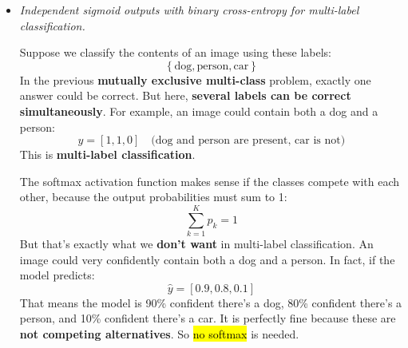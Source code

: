 \begin{itemize}
        In our example, if the correct class is \emph{dog}, then:
        \begin{equation*}
            \mathcal{L}_{\text{CCE}} = - \log(0.90) \approx 0.105
        \end{equation*}
        Which is a low loss, indicating a good prediction. If the correct class were \emph{cat}, then:
        \begin{equation*}
            \mathcal{L}_{\text{CCE}} = - \log(0.08) \approx 2.525
        \end{equation*}
        Which is a high loss, indicating a poor prediction. Therefore, ``\emph{Softmax output with categorical cross-entropy for mutually exclusive multi-class classification}'' is a  design choice.

    \item \emph{Independent sigmoid outputs with binary cross-entropy for multi-label classification.}

        Suppose we classify the contents of an image using these labels:
        \begin{equation*}
            \left\{\text{dog}, \text{person}, \text{car}\right\}
        \end{equation*}
        In the previous \textbf{mutually exclusive multi-class} problem, exactly one answer could be correct. But here, \textbf{several labels can be correct simultaneously}. For example, an image could contain both a dog and a person:
        \begin{equation*}
            y = \left[1, 1, 0\right] \quad \text{(dog and person are present, car is not)}
        \end{equation*}
        This is \textbf{multi-label classification}.

        The softmax activation function makes sense if the classes compete with each other, because the output probabilities must sum to 1:
        \begin{equation*}
            \sum_{k=1}^{K} p_k = 1
        \end{equation*}
        But that's exactly what we \textbf{don't want} in multi-label classification. An image could very confidently contain both a dog and a person. In fact, if the model predicts:
        \begin{equation*}
            \hat{y} = \left[0.9, 0.8, 0.1\right]
        \end{equation*}
        That means the model is 90\% confident there's a dog, 80\% confident there's a person, and 10\% confident there's a car. It is perfectly fine because these are \textbf{not competing alternatives}. So \hl{no softmax} is needed.


\end{itemize}
